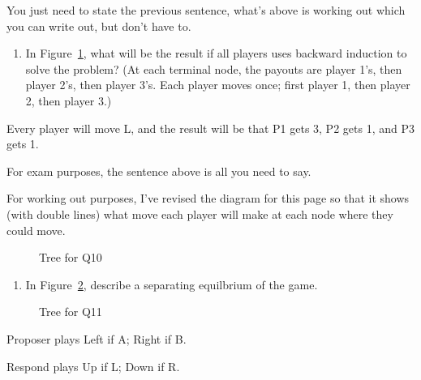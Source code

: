 \documentclass[
  12pt,
  letterpaper,
  DIV=11,
  numbers=noendperiod]{scrartcl}
\providecommand{\tightlist}{%
  \setlength{\itemsep}{0pt}\setlength{\parskip}{0pt}}\usepackage{longtable,booktabs,array}
\begin{document}
You just need to state the previous sentence, what's above is working
out which you can write out, but don't have to.

\begin{enumerate}
\def\labelenumi{\arabic{enumi}.}
\setcounter{enumi}{9}
\tightlist
\item
  In Figure~\ref{fig-back}, what will be the result if all players uses
  backward induction to solve the problem? (At each terminal node, the
  payouts are player 1's, then player 2's, then player 3's. Each player
  moves once; first player 1, then player 2, then player 3.)
\end{enumerate}

Every player will move L, and the result will be that P1 gets 3, P2 gets
1, and P3 gets 1.

For exam purposes, the sentence above is all you need to say.

For working out purposes, I've revised the diagram for this page so that
it shows (with double lines) what move each player will make at each
node where they could move.

\begin{figure}


\caption{\label{fig-back}Tree for Q10}

\end{figure}%

\newpage

\begin{enumerate}
\def\labelenumi{\arabic{enumi}.}
\setcounter{enumi}{10}
\tightlist
\item
  In Figure~\ref{fig-signal}, describe a separating equilbrium of the
  game.
\end{enumerate}

\begin{figure}


\caption{\label{fig-signal}Tree for Q11}

\end{figure}%

\begin{description}
\tightlist
\item[Answer One]
Proposer plays Left if A; Right if B.

Respond plays Up if L; Down if R.
\end{description}
\end{document}
